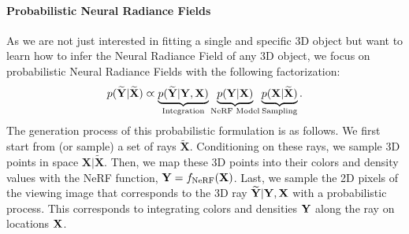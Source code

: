 \paragraph{Probabilistic Neural Radiance Fields} As we are not just interested in fitting a single and specific 3D object but want to learn how to infer the Neural Radiance Field of any 3D object,  we focus on probabilistic Neural Radiance Fields with the following factorization:
\begin{equation}
    p({\bf{\widetilde{Y}}} | {\bf{\widetilde{X}}}) \varpropto
    \underbrace{p({\bf{\widetilde{Y}}} | {\bf{{Y}}}, {\bf{{X}}})}_{\text{Integration}}
    \underbrace{p({\bf{{Y}}} | {\bf{{X}}})}_{\text{NeRF Model}}
    \underbrace{p({\bf{{X}}} | {\bf{\widetilde{X}}})}_{\text{Sampling}}.
\label{eq: probabilitic_NeRF}
\end{equation}
%
The generation process of this probabilistic formulation is as follows.
We first start from (or sample) a set of rays $\widetilde{\mathbf{X}}$.
Conditioning on these rays, we sample 3D points in space $\mathbf{X} \big|\widetilde{\mathbf{X}}$.
Then, we map these 3D points into their colors and density values with the NeRF function, ${\bf{Y}} = f_{\text{NeRF}}({\bf{{X}}})$.
Last, we sample the 2D pixels of the viewing image that corresponds to the 3D ray ${\widetilde{\bf{Y}}}| {\bf{{Y}}}, {\bf{X}}$ with a probabilistic process. This corresponds to integrating colors and densities ${\bf{{Y}}}$ along the ray on locations ${\bf{X}}$.


